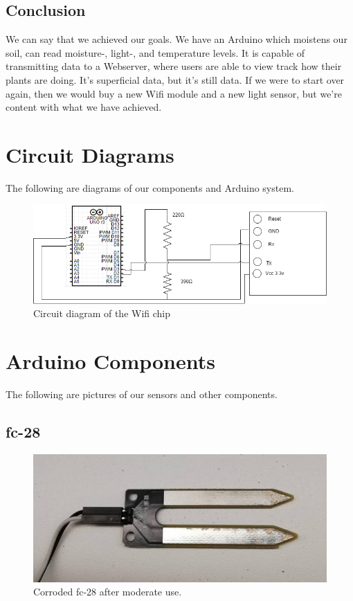 \documentclass[a4paper,12pt,twoside,openright,titlepage]{book}
\begin{document}
\section{Conclusion}

We can say that we achieved our goals. We have an Arduino which moistens our soil, can read moisture-, light-, and temperature levels. It is capable of transmitting data to a Webserver, where users are able to view track how their plants are doing. It's superficial data, but it's still data. If we were to start over again, then we would buy a new Wifi module and a new light sensor, but we're content with what we have achieved.

\chapter{Circuit Diagrams}
The following are diagrams of our components and Arduino system.
\begin{figure}[!ht]
  \centering
      \includegraphics[scale=0.8]{Circuit-Diagram-Wifi-8266}
  \caption{Circuit diagram of the Wifi chip}
  \label{fig:Wifi Circuit}
\end{figure}


\chapter{Arduino Components}
The following are pictures of our sensors and other components.

\section{fc-28}
\begin{figure}[!ht]
  \centering
      \includegraphics{fc-28-corrosion}
  \caption{Corroded fc-28 after moderate use.}
  \label{fig:resistive}
\end{figure}
\end{document}
